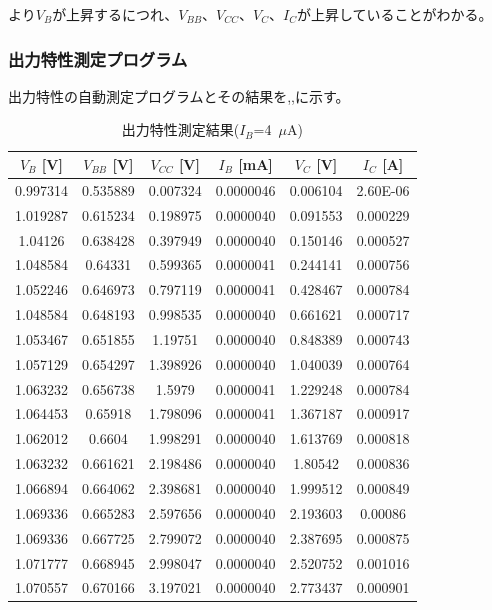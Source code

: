 \documentclass[11pt,dvipdfmx]{jarticle}
\begin{document}
		より$V_B$が上昇するにつれ、$V_{BB}$、$V_{CC}$、$V_C$、$I_C$が上昇していることがわかる。
		\subsubsection{出力特性測定プログラム}
		出力特性の自動測定プログラムとその結果を,,に示す。
		\begin{table}[H]
			\centering
			\caption{出力特性測定結果($I_B$=4\ $\mu$A)}
			\begin{tabular}{cccccc}
			\hline
			$V_B$ [V]& $V_{BB}$ [V]& $V_{CC}$ [V]& $I_B$ [mA]& $V_C$ [V]& $I_C$ [A]\\\hline\hline
			0.997314 & 0.535889 & 0.007324 & 0.0000046 & 0.006104 & 2.60E-06 \\
			1.019287 & 0.615234 & 0.198975 & 0.0000040 & 0.091553 & 0.000229 \\
			1.04126 & 0.638428 & 0.397949 & 0.0000040 & 0.150146 & 0.000527 \\
			1.048584 & 0.64331 & 0.599365 & 0.0000041 & 0.244141 & 0.000756 \\
			1.052246 & 0.646973 & 0.797119 & 0.0000041 & 0.428467 & 0.000784 \\
			1.048584 & 0.648193 & 0.998535 & 0.0000040 & 0.661621 & 0.000717 \\
			1.053467 & 0.651855 & 1.19751 & 0.0000040 & 0.848389 & 0.000743 \\
			1.057129 & 0.654297 & 1.398926 & 0.0000040 & 1.040039 & 0.000764 \\
			1.063232 & 0.656738 & 1.5979 & 0.0000041 & 1.229248 & 0.000784 \\
			1.064453 & 0.65918 & 1.798096 & 0.0000041 & 1.367187 & 0.000917 \\
			1.062012 & 0.6604 & 1.998291 & 0.0000040 & 1.613769 & 0.000818 \\
			1.063232 & 0.661621 & 2.198486 & 0.0000040 & 1.80542 & 0.000836 \\
			1.066894 & 0.664062 & 2.398681 & 0.0000040 & 1.999512 & 0.000849 \\
			1.069336 & 0.665283 & 2.597656 & 0.0000040 & 2.193603 & 0.00086 \\
			1.069336 & 0.667725 & 2.799072 & 0.0000040 & 2.387695 & 0.000875 \\
			1.071777 & 0.668945 & 2.998047 & 0.0000040 & 2.520752 & 0.001016 \\
			1.070557 & 0.670166 & 3.197021 & 0.0000040 & 2.773437 & 0.000901 \\

\end{tabular}
\end{table}
\end{document}
